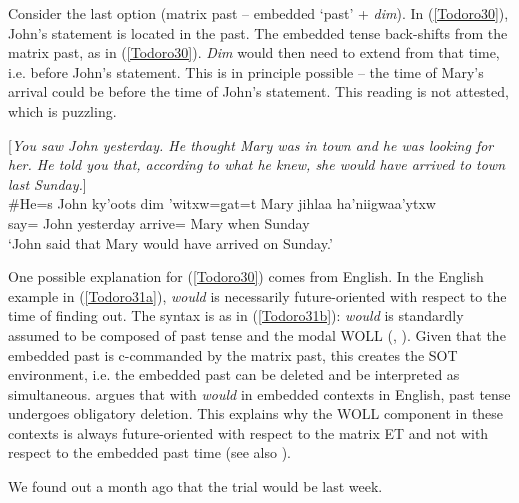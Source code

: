 \documentclass[output=paper]{langscibook}
\begin{document}
Consider the last option (matrix past – embedded ‘past’ + \emph{dim}). In (\ref{Todoro30}), John’s statement is located in the past. The embedded tense back-shifts from the matrix past, as in (\ref{Todoro30}). \emph{Dim} would then need to extend from that time, i.e. before John’s statement. This is in principle possible – the time of Mary’s arrival could be before the time of John’s statement. This reading is not attested, which is puzzling.  

\begin{exe}
\ex \label{Todoro30}
\begin{xlist}

\ex \label{Todoro30a} [\emph{You saw John yesterday. He thought Mary was in town and he was looking for her. He told you that, according to what he knew, she would have arrived to town last Sunday.}]\\
\gll \#{He=s} {John} {ky'oots} {dim} {'witxw=g̱at=t} {Mary} {jihlaa} {ha'niigwaa'ytxw} \\
    say={\pn} John yesterday  arrive= Mary when Sunday\\
\glt ‘John said that Mary would have arrived on Sunday.’ 

\ex \label{Todoro30b}
\tsc{[tp \textbf{past} [aspp [vp [cp [tp \textbf{past} [modp $\emptyset$ [aspp \textbf{\textit{dim}} [vp]]]]]]]}

\end{xlist}
\end{exe}

One possible explanation for (\ref{Todoro30}) comes from English. In the English example in (\ref{Todoro31a}), \textit{would} is necessarily future-oriented with respect to the time of finding out. The syntax is as in (\ref{Todoro31b}): \textit{would} is standardly assumed to be composed of past tense and the modal WOLL (\citealt{abusch1985a}, \citeyear{abusch1988a}). Given that the embedded past is c-commanded by the matrix past, this creates the SOT environment, i.e. the embedded past can be deleted and be interpreted as simultaneous. \citet{kusumoto1999a} argues that with \textit{would} in embedded contexts in English, past tense undergoes obligatory deletion. This explains why the WOLL component in these contexts is always future-oriented with respect to the matrix ET and not with respect to the embedded past time (see also \citealt{wurmbrand2014a}). 

\begin{exe}
\ex \label{Todoro31}
\begin{xlist}

\ex \label{Todoro31a}
We found out a month ago that the trial would be last week. 

\ex \label{Todoro31b}

\end{xlist}
\end{exe}
\end{document}
